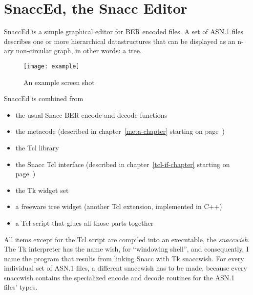 
%
%

\chapter{\label{snacced-chapter}SnaccEd, the Snacc Editor}

SnaccEd is a simple graphical editor for BER encoded files.
A set of ASN.1 files describes one or more hierarchical datastructures that can be displayed as an n-ary non-circular graph, in other words: a tree.

\begin{figure}[ht!]
\begin{center}
\texttt{[image: example]}
\caption[SnaccEd: an example screen shot]{An example screen shot}
\label{snacced-example}
\end{center}
\end{figure}

SnaccEd is combined from
\begin{itemize}
  \item the usual Snacc BER encode and decode functions
  \item the metacode (described in chapter~\ref{meta-chapter} starting on page~\pageref{meta-chapter})
  \item the Tcl library
  \item the Snacc Tcl interface (described in chapter~\ref{tcl-if-chapter} starting on page~\pageref{tcl-if-chapter})
  \item the Tk widget set
  \item a freeware tree widget (another Tcl extension, implemented in C++)
  \item a Tcl script that glues all those parts together
\end{itemize}

All items except for the Tcl script are compiled into an executable, the \emph{snaccwish}.
The Tk interpreter has the name {\ufn wish}, for ``windowing shell'', and consequently, I name the program that results from linking Snacc with Tk {\ufn snaccwish}.
For every individual set of ASN.1 files, a different snaccwish has to be made, because every snaccwish contains the specialized encode and decode routines for the ASN.1 files' types.

